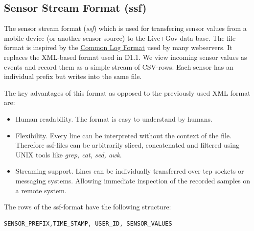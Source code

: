 \subsection{Sensor Stream Format (ssf)}\label{sec:ssf}
The sensor stream format ({\it ssf}) which is used for transfering
sensor values from a mobile device (or another sensor source) to the
Live+Gov data-base. The file format is inspired by the
\href{http://en.wikipedia.org/wiki/Common\_Log\_Format}{Common Log
  Format} used by many webservers. It replaces the XML-based format
used in D1.1. We view incoming sensor values as events and record them
as a simple stream of CSV-rows. Each sensor has an individual prefix
but writes into the same file.

The key advantages of this format as opposed to the previously used
XML format are:
\begin{itemize}
\item Human readability. The format is easy to understand by humans.
\item Flexibility. Every line can be interpreted without the context
  of the file. Therefore ssf-files can be arbitrarily sliced,
  concatenated and filtered using UNIX tools like {\it grep, cat, sed,
    awk}.
\item Streaming support. Lines can be individually transferred over tcp
  sockets or messaging systems. Allowing immediate inspection of the
  recorded samples on a remote system.
\end{itemize}

The rows of the ssf-format have the following structure:
\small
\begin{verbatim}
SENSOR_PREFIX,TIME_STAMP, USER_ID, SENSOR_VALUES
\end{verbatim}
\normalsize

